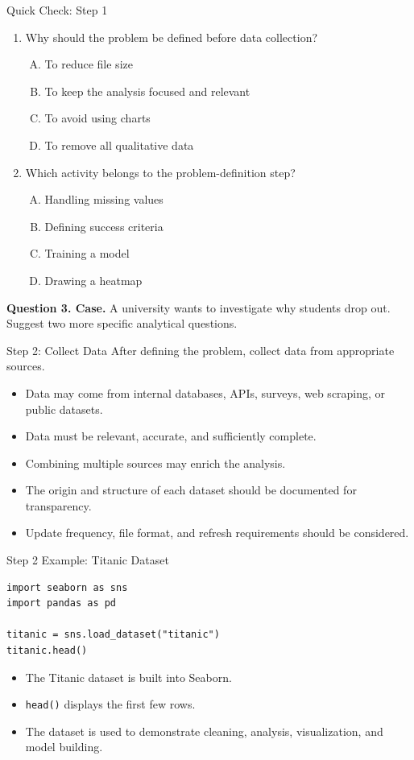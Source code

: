 \documentclass[aspectratio=169,11pt]{beamer}
\newcommand{\quiztitle}[1]{\textbf{\textcolor{QuizOrange}{#1}}}
\begin{document}
\begin{frame}{Quick Check: Step 1}
\begin{enumerate}
  \item Why should the problem be defined before data collection?
  \begin{enumerate}[A.]
    \item To reduce file size
    \item To keep the analysis focused and relevant
    \item To avoid using charts
    \item To remove all qualitative data
  \end{enumerate}
  \item Which activity belongs to the problem-definition step?
  \begin{enumerate}[A.]
    \item Handling missing values
    \item Defining success criteria
    \item Training a model
    \item Drawing a heatmap
  \end{enumerate}
\end{enumerate}
\quiztitle{Question 3. Case.} A university wants to investigate why students drop out. Suggest two more specific analytical questions.
\end{frame}

\begin{frame}{Step 2: Collect Data}
After defining the problem, collect data from appropriate sources.
\begin{itemize}
  \item Data may come from internal databases, APIs, surveys, web scraping, or public datasets.
  \item Data must be relevant, accurate, and sufficiently complete.
  \item Combining multiple sources may enrich the analysis.
  \item The origin and structure of each dataset should be documented for transparency.
  \item Update frequency, file format, and refresh requirements should be considered.
\end{itemize}
\end{frame}

\begin{frame}[fragile]{Step 2 Example: Titanic Dataset}
\begin{lstlisting}[style=py]
import seaborn as sns
import pandas as pd

titanic = sns.load_dataset("titanic")
titanic.head()
\end{lstlisting}
\begin{itemize}
  \item The Titanic dataset is built into Seaborn.
  \item \texttt{head()} displays the first few rows.
  \item The dataset is used to demonstrate cleaning, analysis, visualization, and model building.
\end{itemize}
\end{frame}
\end{document}
